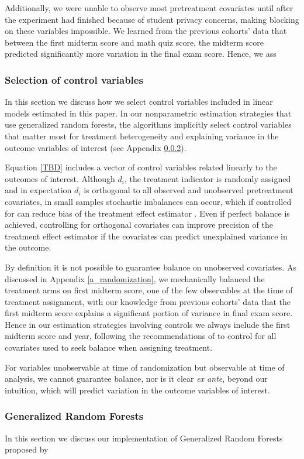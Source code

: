 \documentclass[12pt]{article}
\begin{document}
Additionally, we were unable to observe most pretreatment covariates until after the experiment had finished because of student privacy concerns, making blocking on these variables impossible. We learned from the previous cohorts' data that between the first midterm score and math quiz score, the midterm score predicted significantly more variation in the final exam score. Hence, we ass

\subsubsection{Selection of control variables} \label{a_selection}

In this section we discuss how we select control variables included in linear models estimated in this paper. In our nonparametric estimation strategies that use generalized random forests, the algorithms implicitly select control variables that matter most for treatment heterogeneity and explaining variance in the outcome variables of interest (see Appendix \ref{a_grf}).

Equation \ref{TBD} includes a vector of control variables related linearly to the outcomes of interest. Although $d_i$, the treatment indicator is randomly assigned and in expectation $d_i$ is orthogonal to all observed and unobserved pretreatment covariates, in small samples stochastic imbalances can occur, which if controlled for can reduce bias of the treatment effect estimator \parencite{ai2017}. Even if perfect balance is achieved, controlling for orthogonal covariates can improve precision of the treatment effect estimator if the covariates can predict unexplained variance in the outcome. 

By definition it is not possible to guarantee balance on unobserved covariates. As discussed in Appendix \ref{a_randomization}, we mechanically balanced the treatment arms on first midterm score, one of the few observables at the time of treatment assignment, with our knowledge from previous cohorts' data that the first midterm score explains a significant portion of variance in final exam score. Hence in our estimation strategies involving controls we always include the first midterm score and year, following the recommendations of \textcite{bm2009} to control for all covariates used to seek balance when assigning treatment.

For variables unobservable at time of randomization but observable at time of analysis, we cannot guarantee balance, nor is it clear \textit{ex ante}, beyond our intuition, which will predict variation in the outcome variables of interest. 

\subsubsection{Generalized Random Forests} \label{a_grf}

In this section we discuss our implementation of Generalized Random Forests proposed by \textcite{atw2019}


\item
\end{document}
